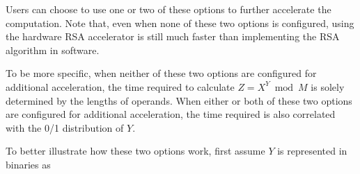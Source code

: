 \documentclass[main\_\_EN.tex]{subfiles}
\begin{document}
Users can choose to use one or two of these options to further accelerate the computation. Note that, even when none of these two options is configured, using the hardware RSA accelerator is still much faster than implementing the RSA algorithm in software.

To be more specific, when neither of these two options are configured for additional acceleration, the time required to calculate \begin{math}Z = X^{Y} \bmod M\end{math} is solely determined by the lengths of operands.  When either or both of these two options are configured for additional acceleration, the time required is also correlated with the 0/1 distribution of \begin{math}Y\end{math}. 

To better illustrate how these two options work, first assume \begin{math}Y \end{math} is represented in binaries as
\end{document}
